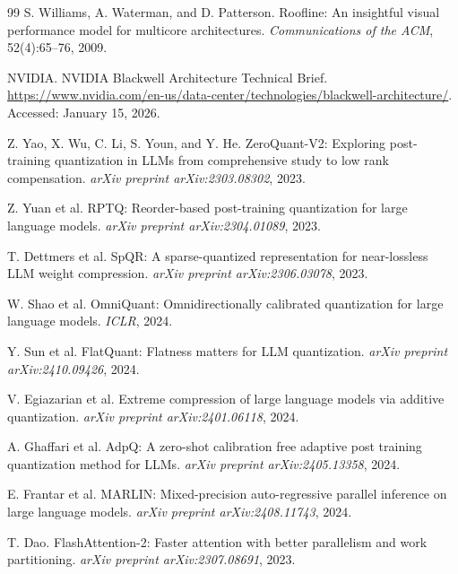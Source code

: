 \documentclass[11pt]{article}
\begin{document}
\begin{thebibliography}{99}
 S. Williams, A. Waterman, and D. Patterson. Roofline: An insightful visual performance model for multicore architectures. \textit{Communications of the ACM}, 52(4):65--76, 2009.

 NVIDIA. NVIDIA Blackwell Architecture Technical Brief. \url{https://www.nvidia.com/en-us/data-center/technologies/blackwell-architecture/}. Accessed: January 15, 2026.


 Z. Yao, X. Wu, C. Li, S. Youn, and Y. He. ZeroQuant-V2: Exploring post-training quantization in LLMs from comprehensive study to low rank compensation. \textit{arXiv preprint arXiv:2303.08302}, 2023.

 Z. Yuan et al. RPTQ: Reorder-based post-training quantization for large language models. \textit{arXiv preprint arXiv:2304.01089}, 2023.

 T. Dettmers et al. SpQR: A sparse-quantized representation for near-lossless LLM weight compression. \textit{arXiv preprint arXiv:2306.03078}, 2023.

 W. Shao et al. OmniQuant: Omnidirectionally calibrated quantization for large language models. \textit{ICLR}, 2024.

 Y. Sun et al. FlatQuant: Flatness matters for LLM quantization. \textit{arXiv preprint arXiv:2410.09426}, 2024.

 V. Egiazarian et al. Extreme compression of large language models via additive quantization. \textit{arXiv preprint arXiv:2401.06118}, 2024.

 A. Ghaffari et al. AdpQ: A zero-shot calibration free adaptive post training quantization method for LLMs. \textit{arXiv preprint arXiv:2405.13358}, 2024.


 E. Frantar et al. MARLIN: Mixed-precision auto-regressive parallel inference on large language models. \textit{arXiv preprint arXiv:2408.11743}, 2024.


 T. Dao. FlashAttention-2: Faster attention with better parallelism and work partitioning. \textit{arXiv preprint arXiv:2307.08691}, 2023.


\end{thebibliography}
\end{document}
